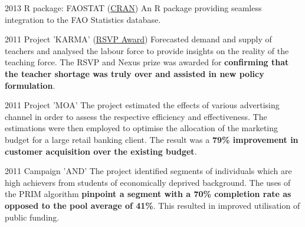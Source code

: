 \documentclass{tccv}
\begin{document}
\begin{yearlist}

\item{2013}
     {R package: FAOSTAT
       (\href{http://cran.r-project.org/web/packages/FAOSTAT/index.html}{CRAN})}
     {An R package providing seamless integration to the FAO
       Statistics database.}

\item{2011} {Project 'KARMA'
  (\href{http://nzdmawards.co.nz/winners-archive/2011-winners-gallery/ministry-of-education-what-teacher-shortage}{RSVP
    Award})} {Forecasted demand and supply of teachers and analysed
  the labour force to provide insights on the reality of the teaching
  force. The RSVP and Nexus prize was awarded for \textbf{confirming
    that the teacher shortage was truly over and assisted in new
    policy formulation}.}

\end{yearlist}


\begin{yearlist}     
\item{2011} {Project 'MOA'} {The project estimated the effects of
  various advertising channel in order to assess the respective
  efficiency and effectiveness. The estimations were then employed to
  optimise the allocation of the marketing budget for a large retail
  banking client. The result was a \textbf{79\% improvement in
    customer acquisition over the existing budget}.}


\item{2011}
     {Campaign 'AND'}
     {The project identified segments of individuals which are high
       achievers from students of economically deprived
       background. The uses of the PRIM algorithm \textbf{pinpoint a
         segment with a 70\% completion rate as opposed to the pool
         average of 41\%}. This resulted in improved utilisation of
       public funding.}

\end{yearlist}


\end{document}
